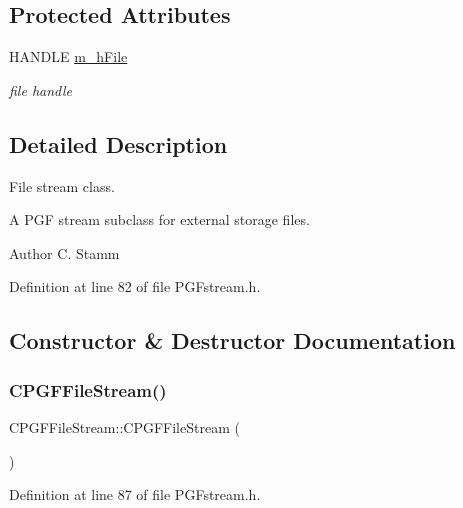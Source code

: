 \subsection*{Protected Attributes}
\begin{DoxyCompactItemize}
\item 
H\+A\+N\+D\+LE \mbox{\hyperlink{classCPGFFileStream_a3e442cbf8c1a8f66d737c36ceb0c9f32}{m\+\_\+h\+File}}
\begin{DoxyCompactList}\small\item\em file handle \end{DoxyCompactList}\end{DoxyCompactItemize}


\subsection{Detailed Description}
File stream class. 

A P\+GF stream subclass for external storage files. \begin{DoxyAuthor}{Author}
C. Stamm 
\end{DoxyAuthor}


Definition at line 82 of file P\+G\+Fstream.\+h.



\subsection{Constructor \& Destructor Documentation}
\mbox{\label{classCPGFFileStream_ae505bb374fe13a0b9cdac3b71ae414e2}} 
\subsubsection{\texorpdfstring{CPGFFileStream()}{CPGFFileStream()}\hspace{0.1cm}{\footnotesize\ttfamily [1/2]}}
{\footnotesize\ttfamily C\+P\+G\+F\+File\+Stream\+::\+C\+P\+G\+F\+File\+Stream (\begin{DoxyParamCaption}{ }\end{DoxyParamCaption})\hspace{0.3cm}{\ttfamily [inline]}}



Definition at line 87 of file P\+G\+Fstream.\+h.


\begin{DoxyCode}{0}

\end{DoxyCode}
\mbox{\label{classCPGFFileStream_ac429f9fa68a762203d727a6c0d586eec}} 
